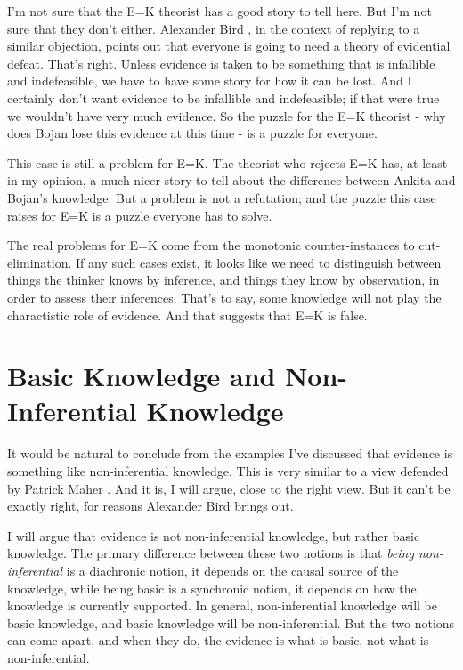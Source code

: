 \documentclass[
  11pt,
]{book}
\begin{document}
I'm not sure that the E=K theorist has a good story to tell here. But I'm not sure that they don't either. Alexander Bird \citeyearpar{Bird2004}, in the context of replying to a similar objection, points out that everyone is going to need a theory of evidential defeat. That's right. Unless evidence is taken to be something that is infallible and indefeasible, we have to have some story for how it can be lost. And I certainly don't want evidence to be infallible and indefeasible; if that were true we wouldn't have very much evidence. So the puzzle for the E=K theorist - why does Bojan lose this evidence at this time - is a puzzle for everyone.

This case is still a problem for E=K. The theorist who rejects E=K has, at least in my opinion, a much nicer story to tell about the difference between Ankita and Bojan's knowledge. But a problem is not a refutation; and the puzzle this case raises for E=K is a puzzle everyone has to solve.

The real problems for E=K come from the monotonic counter-instances to cut-elimination. If any such cases exist, it looks like we need to distinguish between things the thinker knows by inference, and things they know by observation, in order to assess their inferences. That's to say, some knowledge will not play the charactistic role of evidence. And that suggests that E=K is false.

\hypertarget{basic}{%
\section{Basic Knowledge and Non-Inferential Knowledge}\label{basic}}

It would be natural to conclude from the examples I've discussed that evidence is something like non-inferential knowledge. This is very similar to a view defended by Patrick Maher \citeyearpar{Maher1996}. And it is, I will argue, close to the right view. But it can't be exactly right, for reasons Alexander Bird \citeyearpar{Bird2004} brings out.

I will argue that evidence is not non-inferential knowledge, but rather basic knowledge. The primary difference between these two notions is that \emph{being non-inferential} is a diachronic notion, it depends on the causal source of the knowledge, while being basic is a synchronic notion, it depends on how the knowledge is currently supported. In general, non-inferential knowledge will be basic knowledge, and basic knowledge will be non-inferential. But the two notions can come apart, and when they do, the evidence is what is basic, not what is non-inferential.
\end{document}

